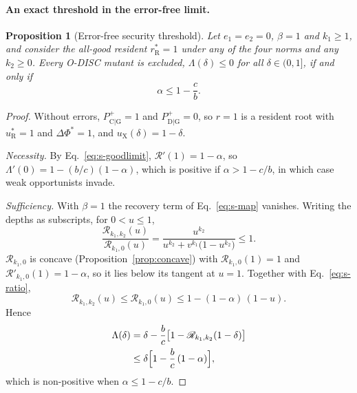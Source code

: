 \documentclass[10pt]{wlscirep}
\newcommand{\Rmap}{\mathscr{R}}            %
\newcommand{\Pp}[1]{P^{+}_{\mathrm{#1}}}   %
\newcommand{\rR}{r_{\mathrm{R}}^{*}}
\newcommand{\uR}{u_{\mathrm{R}}^{*}}
\newcommand{\uX}{u_{\mathrm{X}}}
\newcommand{\dPhi}{\Delta\Phi^{*}}
\theoremstyle{plain}
\newtheorem{proposition}[lemma]{Proposition}
\theoremstyle{remark}
\begin{document}
\paragraph{An exact threshold in the error-free limit.}
\begin{proposition}[Error-free security threshold]\label{prop:errorfree}
Let $e_1=e_2=0$, $\beta=1$ and $k_1\geq1$, and consider the all-good resident $\rR=1$ under any of the four norms and any $k_2\geq0$. Every O-DISC mutant is excluded, $\Lambda(\delta)\leq0$ for all $\delta\in(0,1]$, if and only if
\begin{equation}
\alpha\leq1-\frac{c}{b}.
\label{eq:s-errorfree}
\end{equation}
\end{proposition}
\begin{proof}
Without errors, $\Pp{C|G}=1$ and $\Pp{D|G}=0$, so $r=1$ is a resident root with $\uR=1$ and $\dPhi=1$, and $\uX(\delta)=1-\delta$.

\textit{Necessity.} By Eq.~\eqref{eq:s-goodlimit}, $\Rmap'(1)=1-\alpha$, so $\Lambda'(0)=1-(b/c)(1-\alpha)$, which is positive if $\alpha>1-c/b$, in which case weak opportunists invade.

\textit{Sufficiency.} With $\beta=1$ the recovery term of Eq.~\eqref{eq:s-map} vanishes. Writing the depths as subscripts, for $0<u\leq1$,
\begin{equation}
\frac{\Rmap_{k_1,k_2}(u)}{\Rmap_{k_1,0}(u)}=\frac{u^{k_2}}{u^{k_2}+v^{k_1}\bigl(1-u^{k_2}\bigr)}\leq1.
\label{eq:s-ratio}
\end{equation}
$\Rmap_{k_1,0}$ is concave (Proposition~\ref{prop:concave}) with $\Rmap_{k_1,0}(1)=1$ and $\Rmap'_{k_1,0}(1)=1-\alpha$, so it lies below its tangent at $u=1$. Together with Eq.~\eqref{eq:s-ratio},
\begin{equation}
\Rmap_{k_1,k_2}(u)\leq\Rmap_{k_1,0}(u)\leq1-(1-\alpha)\,(1-u).
\label{eq:s-tangent}
\end{equation}
Hence
\begin{equation}
\begin{aligned}
\Lambda(\delta)&=\delta-\frac{b}{c}\bigl[1-\Rmap_{k_1,k_2}(1-\delta)\bigr]\\
&\leq\delta\Bigl[1-\frac{b}{c}\,(1-\alpha)\Bigr],
\end{aligned}
\label{eq:s-errorfree-bound}
\end{equation}
which is non-positive when $\alpha\leq1-c/b$.
\end{proof}
\end{document}
